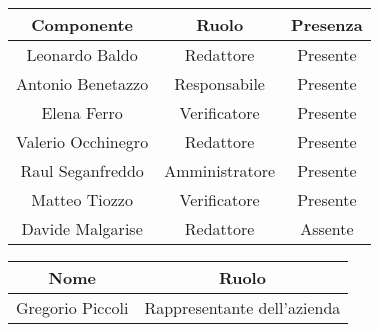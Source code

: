 \documentclass[italian,12pt]{article} %
\begin{document}
\begin{flushleft}
	\begin{table}[!h]
	\begin{tabular}{ |c|c|c| } 
		\hline
		\textbf{Componente} & \textbf{Ruolo} & \textbf{Presenza} \\
		\hline 
		Leonardo Baldo 		& Redattore & Presente \\ 
		Antonio Benetazzo 	& Responsabile & Presente \\
		Elena Ferro 		& Verificatore & Presente \\
		Valerio Occhinegro 	& Redattore & Presente \\
		Raul Seganfreddo 	& Amministratore & Presente \\
		Matteo Tiozzo 		& Verificatore & Presente \\ 
		Davide Malgarise 	& Redattore & Assente \\
		\hline
	\end{tabular}

	\vspace{1cm}

	\begin{tabular}{ |c|c| } 
		\hline
		\textbf{Nome} & \textbf{Ruolo} \\
		\hline 
		Gregorio Piccoli & Rappresentante dell'azienda \\
		\hline
	\end{tabular}
\end{table}

\end{flushleft}
\newpage
\end{document}
